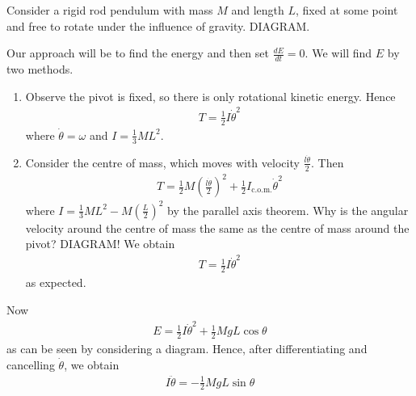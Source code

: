 \documentclass{../../template/note}
\begin{document}
    \begin{example*}[Pendulum]
        Consider a rigid rod pendulum with mass \(M\) and length \(L\), fixed at some point and free to rotate under the influence of gravity. DIAGRAM.

        Our approach will be to find the energy and then set \(\frac{dE}{dt} = 0\). We will find \(E\) by two methods.

        \begin{enumerate}[label=\protect\circled{\arabic*}]
            \item Observe the pivot is fixed, so there is only rotational kinetic energy. Hence
            \begin{align*}
                T = \frac 1 2 I\dot \theta^2
            \end{align*}
            where \(\dot \theta = \omega\) and \(I = \frac 1 3 ML^2\).
            \item Consider the centre of mass, which moves with velocity \(\frac{l\dot \theta} 2\). Then
            \begin{align*}
                T = \frac 1 2 M\left(\frac{l\dot \theta}{2}\right)^2 + \frac 1 2 I_\text{c.o.m.}\dot \theta^2
            \end{align*}
            where \(I = \frac 1 3 ML^2 - M\left(\frac L 2\right)^2\) by the parallel axis theorem. Why is the angular velocity around the centre of mass the same as the centre of mass around the pivot? DIAGRAM!
            We obtain
            \begin{align*}
                T = \frac 1 2 I \dot \theta^2
            \end{align*}
            as expected.           
        \end{enumerate}
        Now
        \begin{align*}
            E = \frac 1 2 I \dot \theta^2 + \frac 1 2 MgL \cos \theta
        \end{align*}
        as can be seen by considering a diagram. Hence, after differentiating and cancelling \(\dot \theta\), we obtain
        \begin{align*}
            I \ddot \theta = -\frac 1 2 MgL \sin \theta
        \end{align*}
    \end{example*}
    
\end{document}
